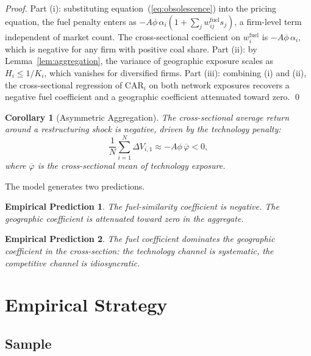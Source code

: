 \documentclass[12pt,a4paper]{article}
\newtheorem{corollary}{Corollary}
\newtheorem{prediction}{Empirical Prediction}
\begin{document}
\begin{proof}
    Part (i): substituting equation~(\ref{eq:obsolescence}) into the pricing equation, the fuel penalty enters as $-A\phi\,\alpha_i(1 + \sum_j w^{\mathrm{fuel}}_{ij} s_j)$, a firm-level term independent of market count. The cross-sectional coefficient on $w^{\mathrm{fuel}}_i$ is $-A\phi\,\alpha_i$, which is negative for any firm with positive coal share. Part (ii): by Lemma~\ref{lem:aggregation}, the variance of geographic exposure scales as $H_i \leq 1/K_i$, which vanishes for diversified firms. Part (iii): combining (i) and (ii), the cross-sectional regression of $\mathrm{CAR}_i$ on both network exposures recovers a negative fuel coefficient and a geographic coefficient attenuated toward zero. \qed
\end{proof}

\begin{corollary}[Asymmetric Aggregation]\label{cor:asymmetry}
    The cross-sectional average return around a restructuring shock is negative, driven by the technology penalty:
    \begin{equation}
        \frac{1}{N}\sum_{i=1}^N \Delta V_{i,1} \approx -A\phi\,\overline{\varphi} < 0,
    \end{equation}
    where $\overline{\varphi}$ is the cross-sectional mean of technology exposure.
\end{corollary}

The model generates two predictions.\label{prop:ets}

\begin{prediction}\label{pred:fuel}
The fuel-similarity coefficient is negative. The geographic coefficient is attenuated toward zero in the aggregate.
\end{prediction}

\begin{prediction}\label{pred:dominance}
The fuel coefficient dominates the geographic coefficient in the cross-section: the technology channel is systematic, the competitive channel is idiosyncratic.
\end{prediction}

\section{Empirical Strategy}\label{sec:empirical}

\subsection{Sample}\label{sec:sample}
\end{document}
